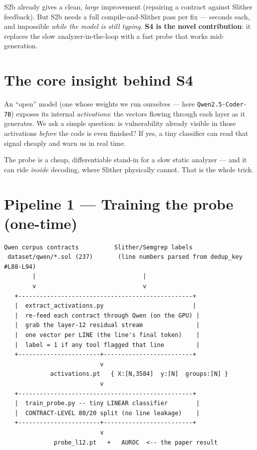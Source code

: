 \documentclass[11pt]{article}
\newcommand{\code}[1]{\texttt{\small #1}}
\begin{document}
\noindent S2b already gives a clean, \emph{large} improvement (repairing a
contract against Slither feedback). But S2b needs a full compile-and-Slither pass
per fix --- seconds each, and impossible \emph{while the model is still typing}.
\textbf{S4 is the novel contribution}: it replaces the slow analyzer-in-the-loop
with a fast probe that works mid-generation.

\section{The core insight behind S4}
An ``open'' model (one whose weights we run ourselves --- here
\code{Qwen2.5-Coder-7B}) exposes its internal \emph{activations}: the vectors
flowing through each layer as it generates. We ask a simple question: is
vulnerability already visible in those activations \emph{before} the code is even
finished? If yes, a tiny classifier can read that signal cheaply and warn us in
real time.

\begin{center}
\end{center}

\noindent The probe is a cheap, differentiable stand-in for a slow static
analyzer --- and it can ride \emph{inside} decoding, where Slither physically
cannot. That is the whole trick.

\section{Pipeline 1 --- Training the probe (one-time)}
\begin{Verbatim}[frame=single,fontsize=\small]
 Qwen corpus contracts          Slither/Semgrep labels
 dataset/qwen/*.sol (237)       (line numbers parsed from dedup_key #L88-L94)
        |                              |
        v                              v
   +-------------------------------------------------+
   |  extract_activations.py                         |
   |  re-feed each contract through Qwen (on the GPU) |
   |  grab the layer-12 residual stream               |
   |  one vector per LINE (the line's final token)    |
   |  label = 1 if any tool flagged that line         |
   +-----------------------+-------------------------+
                           v
             activations.pt   { X:[N,3584]  y:[N]  groups:[N] }
                           v
   +-------------------------------------------------+
   |  train_probe.py -- tiny LINEAR classifier        |
   |  CONTRACT-LEVEL 80/20 split (no line leakage)    |
   +-----------------------+-------------------------+
                           v
              probe_l12.pt   +   AUROC  <-- the paper result
\end{Verbatim}
\end{document}
